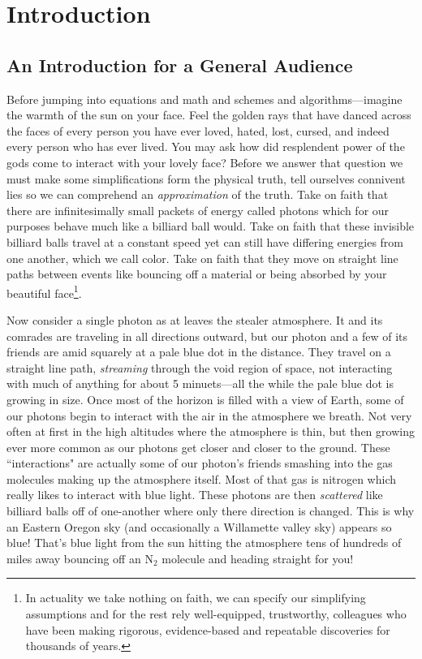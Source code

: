 
\chapter{Introduction}
\label{chap:intro}


\section{An Introduction for a General Audience}

Before jumping into equations and math and schemes and algorithms---imagine the warmth of the sun on your face.
Feel the golden rays that have danced across the faces of every person you have ever loved, hated, lost, cursed, and indeed every person who has ever lived.
You may ask how did resplendent power of the gods come to interact with your lovely face?
Before we answer that question we must make some simplifications form the physical truth, tell ourselves connivent lies so we can comprehend an \textit{approximation} of the truth.
Take on faith that there are infinitesimally small packets of energy called photons which for our purposes behave much like a billiard ball would.
Take on faith that these invisible billiard balls travel at a constant speed yet can still have differing energies from one another, which we call color.
Take on faith that they move on straight line paths between events like bouncing off a material or being absorbed by your beautiful face\footnote{In actuality we take nothing on faith, we can specify our simplifying assumptions and for the rest rely well-equipped, trustworthy, colleagues who have been making rigorous, evidence-based and repeatable discoveries for thousands of years.}.

Now consider a single photon as at leaves the stealer atmosphere.
It and its comrades are traveling in all directions outward, but our photon and a few of its friends are amid squarely at a pale blue dot in the distance.
They travel on a straight line path, \textit{streaming} through the void region of space, not interacting with much of anything for about 5 minuets---all the while the pale blue dot is growing in size.
Once most of the horizon is filled with a view of Earth, some of our photons begin to interact with the air in the atmosphere we breath.
Not very often at first in the high altitudes where the atmosphere is thin, but then growing ever more common as our photons get closer and closer to the ground.
These ``interactions" are actually some of our photon's friends smashing into the gas molecules making up the atmosphere itself.
Most of that gas is nitrogen which really likes to interact with blue light.
These photons are then \textit{scattered} like billiard balls off of one-another where only there direction is changed.
This is why an Eastern Oregon sky (and occasionally a Willamette valley sky) appears so blue!
That's blue light from the sun hitting the atmosphere tens of hundreds of miles away bouncing off an N$_2$ molecule and heading straight for you!

